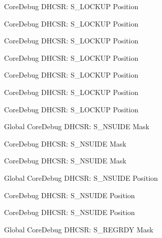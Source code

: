 \begin{DoxyRefList}
\label{deprecated__deprecated000167}%
%
Core\+Debug DHCSR\+: S\+\_\+\+LOCKUP Position 

\label{deprecated__deprecated000113}%
%
Core\+Debug DHCSR\+: S\+\_\+\+LOCKUP Position 

\label{deprecated__deprecated000309}%
%
Core\+Debug DHCSR\+: S\+\_\+\+LOCKUP Position 

\label{deprecated__deprecated000472}%
%
Core\+Debug DHCSR\+: S\+\_\+\+LOCKUP Position 

\label{deprecated__deprecated000021}%
%
Core\+Debug DHCSR\+: S\+\_\+\+LOCKUP Position 

\label{deprecated__deprecated000574}%
%
Core\+Debug DHCSR\+: S\+\_\+\+LOCKUP Position 

\label{deprecated__deprecated000252}%
%
Core\+Debug DHCSR\+: S\+\_\+\+LOCKUP Position  
\item[Global \doxylink{group___c_m_s_i_s___s_c_b_gabe0164afd9f6b8800fb7e05280e0ecda}{Core\+Debug\+\_\+\+DHCSR\+\_\+\+S\+\_\+\+NSUIDE\+\_\+\+Msk} ]\label{deprecated__deprecated000571}%
%
Core\+Debug DHCSR\+: S\+\_\+\+NSUIDE Mask 

\label{deprecated__deprecated000018}%
%
Core\+Debug DHCSR\+: S\+\_\+\+NSUIDE Mask 

\label{deprecated__deprecated000469}%
%
Core\+Debug DHCSR\+: S\+\_\+\+NSUIDE Mask  
\item[Global \doxylink{group___c_m_s_i_s___s_c_b_ga59e228c682eec72e892b2ce018afe477}{Core\+Debug\+\_\+\+DHCSR\+\_\+\+S\+\_\+\+NSUIDE\+\_\+\+Pos} ]\label{deprecated__deprecated000570}%
%
Core\+Debug DHCSR\+: S\+\_\+\+NSUIDE Position 

\label{deprecated__deprecated000017}%
%
Core\+Debug DHCSR\+: S\+\_\+\+NSUIDE Position 

\label{deprecated__deprecated000468}%
%
Core\+Debug DHCSR\+: S\+\_\+\+NSUIDE Position  
\item[Global \doxylink{group___c_m_s_i_s___core_debug_gac4cd6f3178de48f473d8903e8c847c07}{Core\+Debug\+\_\+\+DHCSR\+\_\+\+S\+\_\+\+REGRDY\+\_\+\+Msk} ]\label{deprecated__deprecated000316}%
%
Core\+Debug DHCSR\+: S\+\_\+\+REGRDY Mask 


\end{DoxyRefList}
